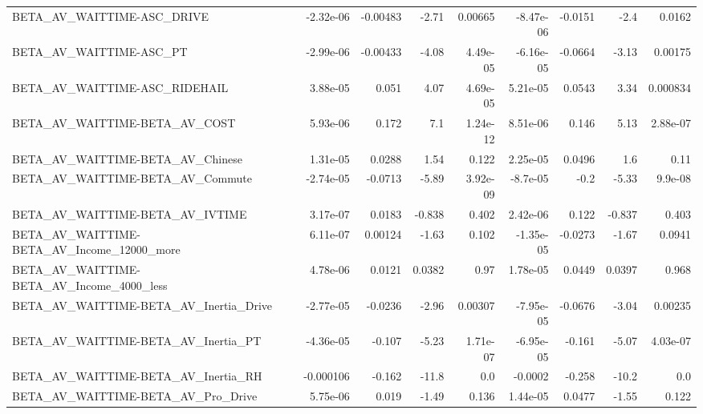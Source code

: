 \begin{tabular}{lrrrrrrrr}
BETA\_AV\_WAITTIME-ASC\_DRIVE                         &   -2.32e-06 &     -0.00483 &    -2.71 &  0.00665 &  -8.47e-06 &     -0.0151 &         -2.4 &        0.0162 \\
BETA\_AV\_WAITTIME-ASC\_PT                            &   -2.99e-06 &     -0.00433 &    -4.08 & 4.49e-05 &  -6.16e-05 &     -0.0664 &        -3.13 &       0.00175 \\
BETA\_AV\_WAITTIME-ASC\_RIDEHAIL                      &    3.88e-05 &        0.051 &     4.07 & 4.69e-05 &   5.21e-05 &      0.0543 &         3.34 &      0.000834 \\
BETA\_AV\_WAITTIME-BETA\_AV\_COST                      &    5.93e-06 &        0.172 &      7.1 & 1.24e-12 &   8.51e-06 &       0.146 &         5.13 &      2.88e-07 \\
BETA\_AV\_WAITTIME-BETA\_AV\_Chinese                   &    1.31e-05 &       0.0288 &     1.54 &    0.122 &   2.25e-05 &      0.0496 &          1.6 &          0.11 \\
BETA\_AV\_WAITTIME-BETA\_AV\_Commute                   &   -2.74e-05 &      -0.0713 &    -5.89 & 3.92e-09 &   -8.7e-05 &        -0.2 &        -5.33 &       9.9e-08 \\
BETA\_AV\_WAITTIME-BETA\_AV\_IVTIME                    &    3.17e-07 &       0.0183 &   -0.838 &    0.402 &   2.42e-06 &       0.122 &       -0.837 &         0.403 \\
BETA\_AV\_WAITTIME-BETA\_AV\_Income\_12000\_more         &    6.11e-07 &      0.00124 &    -1.63 &    0.102 &  -1.35e-05 &     -0.0273 &        -1.67 &        0.0941 \\
BETA\_AV\_WAITTIME-BETA\_AV\_Income\_4000\_less          &    4.78e-06 &       0.0121 &   0.0382 &     0.97 &   1.78e-05 &      0.0449 &       0.0397 &         0.968 \\
BETA\_AV\_WAITTIME-BETA\_AV\_Inertia\_Drive             &   -2.77e-05 &      -0.0236 &    -2.96 &  0.00307 &  -7.95e-05 &     -0.0676 &        -3.04 &       0.00235 \\
BETA\_AV\_WAITTIME-BETA\_AV\_Inertia\_PT                &   -4.36e-05 &       -0.107 &    -5.23 & 1.71e-07 &  -6.95e-05 &      -0.161 &        -5.07 &      4.03e-07 \\
BETA\_AV\_WAITTIME-BETA\_AV\_Inertia\_RH                &   -0.000106 &       -0.162 &    -11.8 &      0.0 &    -0.0002 &      -0.258 &        -10.2 &           0.0 \\
BETA\_AV\_WAITTIME-BETA\_AV\_Pro\_Drive                 &    5.75e-06 &        0.019 &    -1.49 &    0.136 &   1.44e-05 &      0.0477 &        -1.55 &         0.122 \\

\end{tabular}
